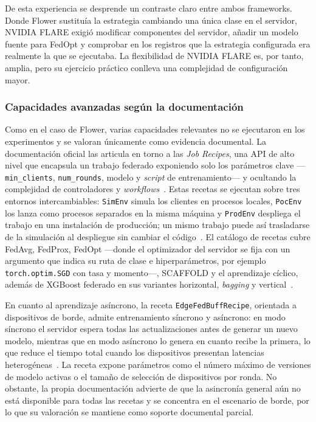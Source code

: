 De esta experiencia se desprende un contraste claro entre ambos frameworks.
Donde Flower sustituía la estrategia cambiando una única clase en el servidor,
NVIDIA FLARE exigió modificar componentes del servidor, añadir un modelo fuente para
FedOpt y comprobar en los registros que la estrategia configurada era realmente la
que se ejecutaba. La flexibilidad de NVIDIA FLARE es, por tanto, amplia, pero su
ejercicio práctico conlleva una complejidad de configuración mayor.

\subsubsection{Capacidades avanzadas según la documentación}\label{subsec:flex-nvflare-doc}

Como en el caso de Flower, varias capacidades relevantes no se ejecutaron en los
experimentos y se valoran únicamente como evidencia documental. La documentación
oficial las articula en torno a las \textit{Job Recipes}, una API de alto nivel que
encapsula un trabajo federado exponiendo solo los parámetros clave —\texttt{min\_\allowbreak clients},
\texttt{num\_\allowbreak rounds}, modelo y \textit{script} de entrenamiento— y ocultando la
complejidad de controladores y \textit{workflows}~\parencite{nvflareRecipes}. Estas
recetas se ejecutan sobre tres entornos intercambiables: \texttt{SimEnv} simula los
clientes en procesos locales, \texttt{PocEnv} los lanza como procesos separados en la
misma máquina y \texttt{ProdEnv} despliega el trabajo en una instalación de
producción; un mismo trabajo puede así trasladarse de la simulación al despliegue sin
cambiar el código~\parencite{nvflareRecipes}. El catálogo de recetas cubre FedAvg,
FedProx, FedOpt —donde el optimizador del servidor se fija con un argumento que indica
su ruta de clase e hiperparámetros, por ejemplo \texttt{torch.optim.SGD} con tasa y
momento—, SCAFFOLD y el aprendizaje cíclico, además de XGBoost federado en sus
variantes horizontal, \textit{bagging} y vertical~\parencite{nvflareAlgorithms,nvflareFedopt}.

En cuanto al aprendizaje asíncrono, la receta \texttt{EdgeFedBuffRecipe}, orientada a
dispositivos de borde, admite entrenamiento síncrono y asíncrono: en modo síncrono el
servidor espera todas las actualizaciones antes de generar un nuevo modelo, mientras
que en modo asíncrono lo genera en cuanto recibe la primera, lo que reduce el tiempo
total cuando los dispositivos presentan latencias heterogéneas~\parencite{nvflareEdge,nvflareWelcome}.
La receta expone parámetros como el número máximo de versiones de modelo activas o el
tamaño de selección de dispositivos por ronda. No obstante, la propia documentación
advierte de que la asincronía general aún no está disponible para todas las recetas y
se concentra en el escenario de borde, por lo que su valoración se mantiene como
soporte documental parcial.

